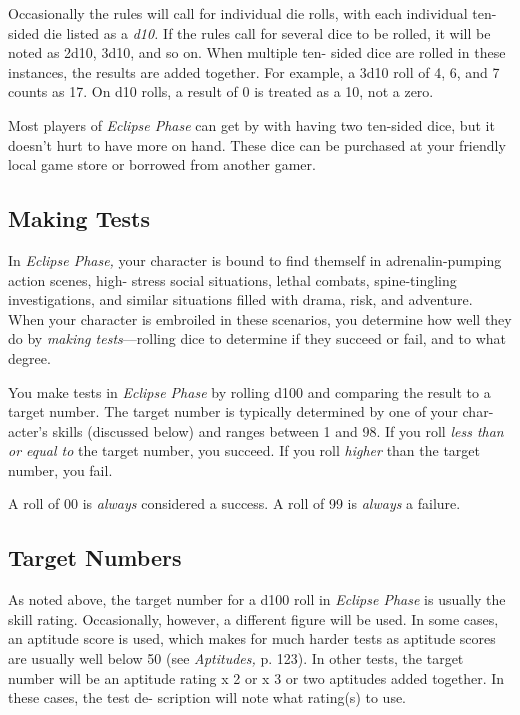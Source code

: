 Occasionally the rules will call for individual die 
rolls, with each individual ten-sided die listed as a \textit{d10. }
If the rules call for several dice to be rolled, it will be 
noted as 2d10, 3d10, and so on. When multiple ten-
sided dice are rolled in these instances, the results are 
added together. For example, a 3d10 roll of 4, 6, and 
7 counts as 17. On d10 rolls, a result of 0 is treated as 
a 10, not a zero.

Most players of \textit{Eclipse Phase} can get by with 
having two ten-sided dice, but it doesn't hurt to 
have more on hand. These dice can be purchased 
at your friendly local game store or borrowed from 
another gamer.

\subsection{Making Tests}

In  \textit{Eclipse Phase,} your character is bound to find 
themself in adrenalin-pumping action scenes, high-
stress social situations, lethal combats, spine-tingling 
investigations, and similar situations filled with drama, 
risk, and adventure. When your character is embroiled 
in these scenarios, you determine how well they do by 
\textit{making tests}—rolling dice to determine if they succeed 
or fail, and to what degree.

You make tests in \textit{Eclipse Phase} by rolling d100 and 
comparing the result to a target number. The target 
number is typically determined by one of your char-
acter's skills (discussed below) and ranges between 1 
and 98. If you roll \textit{less than or equal to} the target 
number, you succeed. If you roll \textit{higher} than the target 
number, you fail.

A roll of 00 is \textit{always} considered a success. A roll of 
99 is \textit{always }a failure.

\subsection{Target Numbers}

As noted above, the target number for a d100 roll in 
\textit{Eclipse Phase} is usually the skill rating. Occasionally, 
however, a different figure will be used. In some cases, 
an aptitude score is used, which makes for much 
harder tests as aptitude scores are usually well below 
50 (see \textit{Aptitudes,} p. 123). In other tests, the target 
number will be an aptitude rating x 2 or x 3 or two 
aptitudes added together. In these cases, the test de-
scription will note what rating(s) to use.

